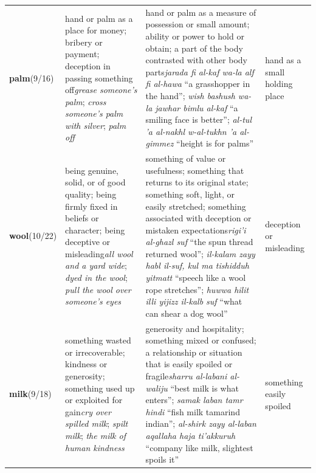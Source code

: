 \begin{table}[t]
\begin{tabular}{@{}p{}p{}p{}p{}@{}}
\textbf{palm}\newline (9/16)
& \textcolor{encolor}{hand or palm as a place for money; bribery or payment; deception in passing something off}\newline \textit{grease someone's palm}; \textit{cross someone’s palm with silver}; \textit{palm off}
& \textcolor{zhcolor}{hand or palm as a measure of possession or small amount; ability or power to hold or obtain; a part of the body contrasted with other body parts}\newline \textit{jarada fi al-kaf wa-la alf fi al-hawa} ``a grasshopper in the hand''; \textit{wish bashush wa-la jawhar bimlu al-kaf} ``a smiling face is better''; \textit{al-tul 'a al-nakhl w-al-tukhn 'a al-gimmez} ``height is for palms''
& hand as a small holding place \\
\textbf{wool}\newline (10/22)
& \textcolor{encolor}{being genuine, solid, or of good quality; being firmly fixed in beliefs or character; being deceptive or misleading}\newline \textit{all wool and a yard wide}; \textit{dyed in the wool}; \textit{pull the wool over someone's eyes}
& \textcolor{zhcolor}{something of value or usefulness; something that returns to its original state; something soft, light, or easily stretched; something associated with deception or mistaken expectations}\newline \textit{rigi'i al-ghazl suf} ``the spun thread returned wool''; \textit{il-kalam zayy habl il-suf, kul ma tishidduh yitmatt} ``speech like a wool rope stretches''; \textit{huwwa hilit illi yijizz il-kalb suf} ``what can shear a dog wool''
& deception or misleading \\
\textbf{milk}\newline (9/18)
& \textcolor{encolor}{something wasted or irrecoverable; kindness or generosity; something used up or exploited for gain}\newline \textit{cry over spilled milk}; \textit{spilt milk}; \textit{the milk of human kindness}
& \textcolor{zhcolor}{generosity and hospitality; something mixed or confused; a relationship or situation that is easily spoiled or fragile}\newline \textit{sharru al-labani al-waliju} ``best milk is what enters''; \textit{samak laban tamr hindi} ``fish milk tamarind indian''; \textit{al-shirk zayy al-laban aqallaha haja ti'akkuruh} ``company like milk, slightest spoils it''
& something easily spoiled \\
\bottomrule
\end{tabular}
\end{table}

